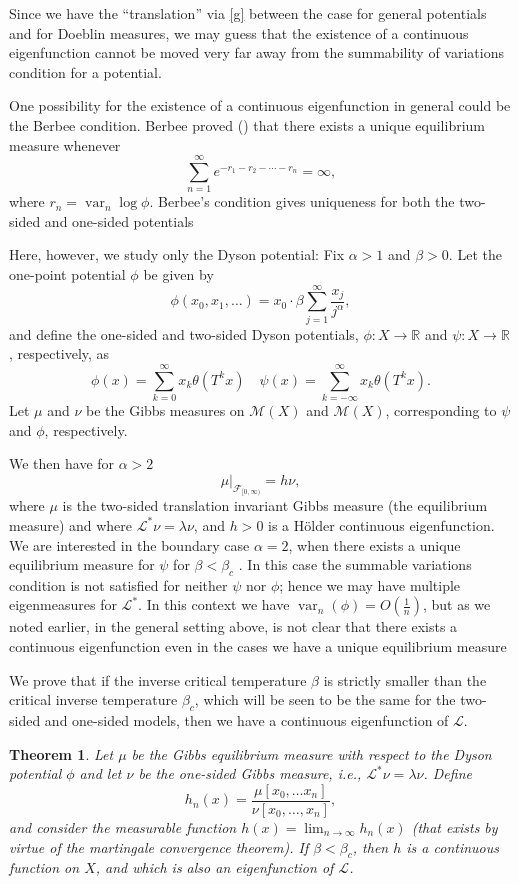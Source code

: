 \documentclass[11pt, a4paper]{amsart}
\newtheorem{thm}{Theorem}
\theoremstyle{definition}
\theoremstyle{remark}
\providecommand{\RR}{\mathbb{R}}
\providecommand{\CM}{\mathscr{M}}
\providecommand{\opn}{\operatorname}
\providecommand{\var}{\opn{var}}
\def\X{X}
\begin{document}
Since we have the ``translation'' via \eqref{g} between the case for general
potentials and for Doeblin measures, we may guess that the existence of a
continuous eigenfunction cannot be moved very far away from the summability of
variations condition for a potential.

One possibility for the existence of a continuous eigenfunction in general could
be the Berbee condition. Berbee proved (\cite{berbee89}) that there exists a
unique equilibrium measure whenever
\begin{equation}\label{berbee}
  \sum_{n=1}^\infty e^{-r_1-r_2-\cdots-r_n}=\infty,    
\end{equation}
where $r_n=\var_n \log \phi$. Berbee's condition gives uniqueness for both the
two-sided and one-sided potentials

Here, however, we study only the Dyson potential: Fix $\alpha>1$ and $\beta>0$.
Let the one-point potential $\phi$ be given by
$$\phi(x_0, x_1,\ldots)=x_0\cdot \beta \sum_{j=1}^\infty \frac{x_j}{j^\alpha},$$
and define the one-sided and two-sided Dyson potentials, $\phi:\X\to \RR$ and
$\psi:\X\to\RR$, respectively, as
$$
\phi(x)=\sum_{k=0}^\infty x_k \theta (T^k x) \quad \psi(x)=\sum_{k=-\infty}^\infty x_k \theta(T^k x).
$$
Let $\mu$ and $\nu$ be the Gibbs measures on $\CM(\X)$ and $\CM(\X)$,
corresponding to $\psi$ and $\phi$, respectively.

We then have for $\alpha>2$
$$\mu\vert_{{\mathcal F}_{[0,\infty)}}= h\nu,$$
where $\mu$ is the two-sided translation invariant Gibbs measure (the
equilibrium measure) and where ${\mathcal L}^*\nu=\lambda \nu$, and $h>0$ is a
H\"older continuous eigenfunction. We are interested in the boundary case
$\alpha=2$, when there exists a unique equilibrium measure for $\psi$ for
$\beta<\beta_c$ \cite{ACCN}. In this case the summable variations condition is
not satisfied for neither $\psi$ nor $\phi$; hence we may have multiple
eigenmeasures for ${\mathcal L}^*$. In this context we have
$\var_n(\phi)=O(\frac{1}{n})$, but as we noted earlier, in the general setting
above, is not clear that there exists a continuous eigenfunction even in the
cases we have a unique equilibrium measure

We prove that if the inverse critical temperature $\beta$ is strictly smaller
than the critical inverse temperature $\beta_c$, which will be seen to be the
same for the two-sided and one-sided models, then we have a continuous
eigenfunction of ${\mathcal L}$.

\begin{thm}\label{main} Let $\mu$ be the Gibbs equilibrium measure with respect
  to the Dyson potential $\phi$ and let $\nu$ be the one-sided Gibbs measure,
  i.e., ${\mathcal L}^*\nu=\lambda \nu$. Define
$$h_n(x)=\frac{\mu[x_0,\ldots x_n]}{\nu[x_0,\ldots, x_n]},$$
and consider the measurable function $h(x)=\lim_{n\to \infty}h_n(x)$ (that
exists by virtue of the martingale convergence theorem). If $\beta<\beta_c$,
then $h$ is a continuous function on $\X$, and which is also an eigenfunction of
${\mathcal L}$.
\end{thm}
\end{document}
